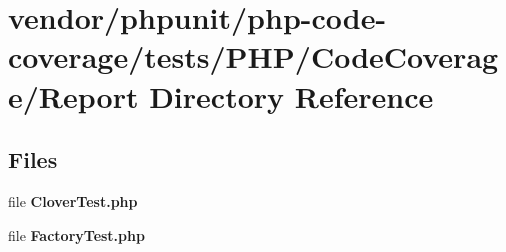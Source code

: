 \section{vendor/phpunit/php-\/code-\/coverage/tests/\+P\+H\+P/\+Code\+Coverage/\+Report Directory Reference}
\label{dir_d2f131ce4f7e1101fb87c7211a734c21}
\subsection*{Files}
\begin{DoxyCompactItemize}
\item 
file {\bf Clover\+Test.\+php}
\item 
file {\bf Factory\+Test.\+php}
\end{DoxyCompactItemize}

